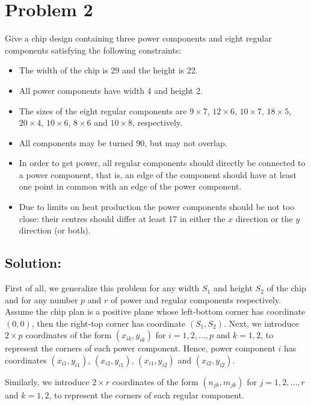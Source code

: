 \section*{Problem 2}

Give a chip design containing three power components and eight regular components satisfying the following constraints:
\begin{itemize}
  \item The width of the chip is 29 and the height is 22.
  \item All power components have width 4 and height 2.
  \item The sizes of the eight regular components are $9 \times 7$, $12 \times 6$, $10 \times 7$, $18 \times 5$, $20 \times 4$, $10 \times 6$, $8 \times 6$ and $10 \times 8$, respectively.
  \item All components may be turned 90, but may not overlap.
  \item In order to get power, all regular components should directly be connected to a power component, that is, an edge of the component should have at least one point in common with an edge of the power component.
  \item Due to limits on heat production the power components should be not too close: their centres should differ at least 17 in either the $x$ direction or the $y$ direction (or both).
\end{itemize}

\vspace{4mm}

\subsection*{Solution:}
First of all, we generalize this problem for any width $S_1$ and height $S_2$ of the chip and for any number $p$ and $r$ of power and regular components respectively. Assume the chip plan is a positive plane whose left-bottom corner has coordinate $(0, 0)$, then the right-top corner has coordinate $(S_1, S_2)$.
Next, we introduce $2 \times p$ coordinates of the form $(x_{ik}, y_{ik})$ for $i = 1, 2 , ... , p$ and $k = 1, 2$, to represent the corners of each power component. Hence, power component $i$ has coordinates $(x_{i1}, y_{i1})$, $(x_{i2}, y_{i1})$, $(x_{i1}, y_{i2})$ and $(x_{i2}, y_{i2})$.

Similarly, we introduce $2 \times r$ coordinates of the form $(n_{jk}, m_{jk})$ for $j = 1, 2 , ... , r$ and $k = 1, 2$, to represent the corners of each regular component.

